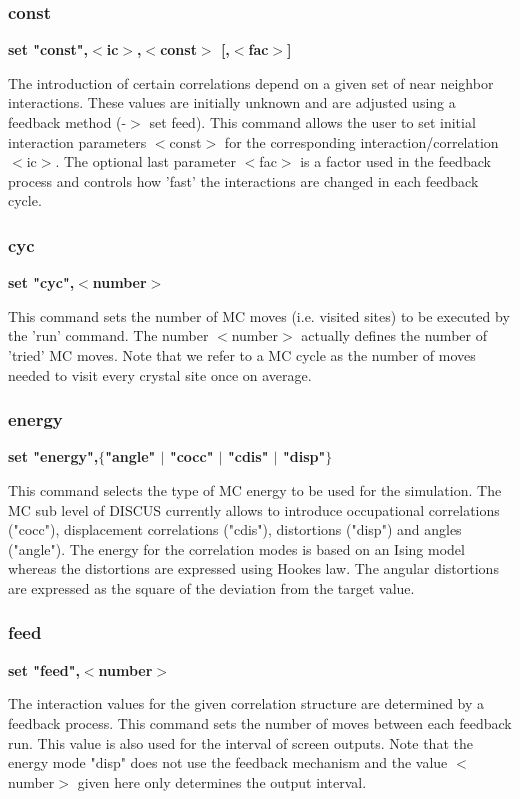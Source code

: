 \subsubsection{const}
{\bf set "const",$ <$ic$> $,$ <$const$> $ [,$ <$fac$> $] \par }
\par
\vspace{3pt}
The introduction of certain correlations depend on a given set of 
near neighbor interactions. These values are initially unknown and 
are adjusted using a feedback method (-$> $ set feed). This command 
allows the user to set initial interaction parameters $ <$const$> $ for 
the corresponding interaction/correlation $ <$ic$> $. The optional last 
parameter $ <$fac$> $ is a factor used in the feedback process and controls 
how 'fast' the interactions are changed in each feedback cycle. 
\subsubsection{cyc}
{\bf set "cyc",$ <$number$> $ \par }
\par
\vspace{3pt}
This command sets the number of MC moves (i.e. visited sites) to 
be executed by the 'run' command. The number $ <$number$> $ actually 
defines the number of 'tried' MC moves. Note that we refer to a 
MC cycle as the number of moves needed to visit every crystal site 
once on average. 
\subsubsection{energy}
{\bf set "energy",$ \{$"angle" $| $ "cocc" $| $ "cdis" $| $ "disp"$\} $ \par }
\par
\vspace{3pt}
This command selects the type of MC energy to be used for the 
simulation. The MC sub level of DISCUS currently allows to 
introduce occupational correlations ("cocc"), displacement 
correlations ("cdis"), distortions ("disp") and angles ("angle"). 
The energy for the correlation modes is based on an Ising model 
whereas the distortions are expressed using Hookes law. The 
angular distortions are expressed as the square of the deviation 
from the target value. 
\subsubsection{feed}
{\bf set "feed",$ <$number$> $ \par }
\par
\vspace{3pt}
The interaction values for the given correlation structure are 
determined by a feedback process. This command sets the number 
of moves between each feedback run. This value is also used for 
the interval of screen outputs. Note that the energy mode "disp" 
does not use the feedback mechanism and the value $ <$number$> $ given 
here only determines the output interval. 
